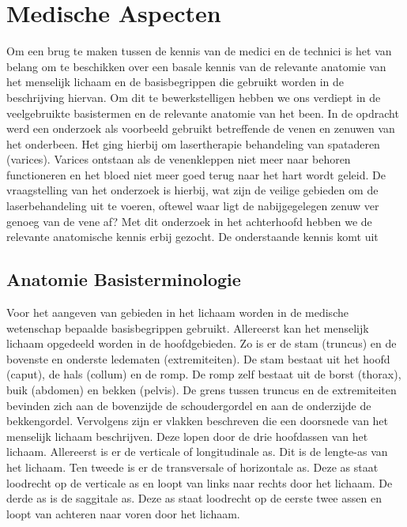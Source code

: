 \section{Medische Aspecten}
\label{Medische Aspecten}


Om een brug te maken tussen de kennis van de medici en de technici is het van belang om te beschikken over een basale kennis van de relevante anatomie van het menselijk lichaam en de basisbegrippen die gebruikt worden in de beschrijving hiervan. Om dit te bewerkstelligen hebben we ons verdiept in de veelgebruikte basistermen en de relevante anatomie van het been. In de opdracht werd een onderzoek als voorbeeld gebruikt betreffende de venen en zenuwen van het onderbeen. Het ging hierbij om lasertherapie behandeling van spataderen (varices). Varices ontstaan als de venenkleppen niet meer naar behoren functioneren en het bloed niet meer goed terug naar het hart wordt geleid. De vraagstelling van het onderzoek is hierbij, wat zijn de veilige gebieden om de laserbehandeling uit te voeren, oftewel waar ligt de nabijgegelegen zenuw ver genoeg van de vene af? Met dit onderzoek in het achterhoofd hebben we de relevante anatomische kennis erbij gezocht.
De onderstaande kennis komt uit %

\subsection{Anatomie Basisterminologie}

Voor het aangeven van gebieden in het lichaam worden in de medische wetenschap bepaalde basisbegrippen gebruikt. Allereerst kan het menselijk lichaam opgedeeld worden in de hoofdgebieden. Zo is er de stam (truncus) en de bovenste en onderste ledematen (extremiteiten). De stam bestaat uit het hoofd (caput), de hals (collum) en de romp. De romp zelf bestaat uit de borst (thorax), buik (abdomen) en bekken (pelvis). De grens tussen truncus en de extremiteiten bevinden zich aan de bovenzijde de schoudergordel en aan de onderzijde de bekkengordel. Vervolgens zijn er vlakken beschreven die een doorsnede van het menselijk lichaam beschrijven. Deze lopen door de drie hoofdassen van het lichaam. Allereerst is er de verticale of longitudinale as. Dit is de lengte-as van het lichaam. Ten tweede is er de transversale of horizontale as. Deze as staat loodrecht op de verticale as en loopt van links naar rechts door het lichaam. De derde as is de saggitale as. Deze as staat loodrecht op de eerste twee assen en loopt van achteren naar voren door het lichaam. 

